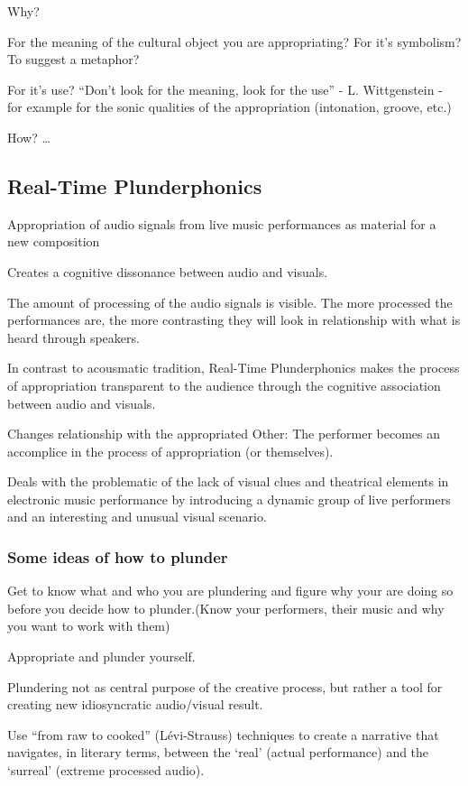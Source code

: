Why?

For the meaning of the cultural object you are appropriating? For it’s symbolism? To suggest a metaphor?

For it’s use? ``Don’t look for the meaning, look for the use'' - L. Wittgenstein - for example for the sonic qualities of the appropriation (intonation, groove, etc.)

How? …

\subsection{Real-Time Plunderphonics}

Appropriation of audio signals from live music performances as material for a new composition

Creates a cognitive dissonance between audio and visuals.

The amount of processing of the audio signals is visible. The more processed the performances are, the more contrasting they will look in relationship with what is heard through speakers.

In contrast to acousmatic tradition, Real-Time Plunderphonics makes the process of appropriation transparent to the audience through the cognitive association between audio and visuals.

Changes relationship with the appropriated Other: The performer becomes an accomplice in the process of appropriation (or themselves). 

Deals with the problematic of the lack of visual clues and theatrical elements in electronic music performance by introducing a dynamic group of live performers and an interesting and unusual visual scenario.  

\subsubsection{Some ideas of how to plunder}

Get to know what and who you are plundering and figure why your are doing so before you decide how to plunder.(Know your performers, their music and why you want to work with them)

Appropriate and plunder yourself. 

Plundering not as central purpose of the creative process, but rather a tool for creating new idiosyncratic audio/visual result. 

Use ``from raw to cooked'' (L\'{e}vi-Strauss) techniques to create a narrative that navigates, in literary terms, between the ‘real’ (actual performance) and the `surreal' (extreme processed audio).

